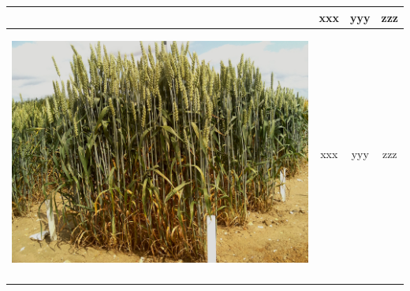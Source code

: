 \begin{table}[h!]
\begin{tabular}{ | c | c | c | c |}
\begin{minipage}{.3\textwidth}
\begin{center}
      \end{center}
    \end{minipage}
    &
      xxx
    & 
      yyy
    & 
      zzz
    \\ \hline
    \begin{minipage}{.3\textwidth}
      \begin{center}
		\includegraphics[width=\linewidth]{Images/003}
      \end{center}
    \end{minipage}
    &
      xxx
    & 
      yyy
    & 
      zzz
    \\ \hline
    \begin{minipage}{.3\textwidth}
      \begin{center}

\end{center}
\end{minipage}
\end{tabular}
\end{table}
